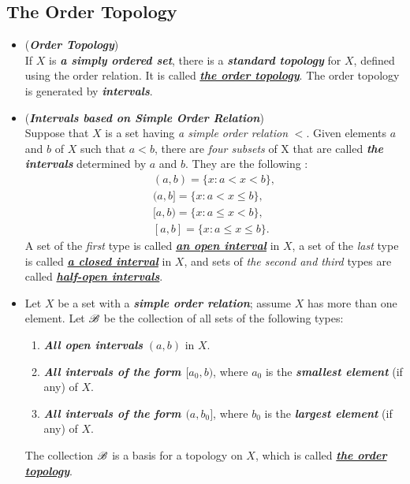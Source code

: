 \documentclass[11pt]{article}
\begin{document}
\subsection{The Order Topology}
\begin{itemize}
\item \begin{example}(\emph{\textbf{Order Topology}})\\
If $X$ is \emph{\textbf{a simply ordered set}}, there is a \emph{\textbf{standard topology}} for $X$, defined using the order relation. It is called \underline{\emph{\textbf{the order topology}}}. The order topology is generated by \emph{\textbf{intervals}}.
\end{example}

\item \begin{definition} (\emph{\textbf{Intervals based on Simple Order Relation}})\\
Suppose that $X$ is a set having \emph{a simple order relation} $<$. Given elements $a$ and $b$ of $X$ such that $a < b$, there are \emph{four subsets} of X that are called \emph{\textbf{the intervals}} determined by $a$ and $b$. They are the following :
\begin{align*}
(a,b) = \{x: a < x < b\},\\
(a,b] = \{x: a < x \le b\},\\
[a,b) = \{x: a \le x < b\},\\
[a, b] = \{x: a \le x \le b\}.
\end{align*}
A set of the \emph{first} type is called \underline{\textit{\textbf{an open interval}}} in $X$, a set of the \emph{last} type is called \underline{\textit{\textbf{a closed interval}}} in $X$, and sets of \emph{the second and third} types are called \underline{\textit{\textbf{half-open intervals}}}.
\end{definition}

\item \begin{definition}
Let $X$ be a set with a \emph{\textbf{simple order relation}}; assume $X$ has more than one element. Let ${\mathscr B}$ be the collection of all sets of the following types:
\begin{enumerate}
\item \emph{\textbf{All open intervals}} $(a, b)$ in $X$.
\item \emph{\textbf{All intervals of the form $[a_0,b)$}}, where $a_0$ is the \emph{\textbf{smallest element}} (if any) of $X$.
\item \emph{\textbf{All intervals of the form $(a, b_0]$}}, where $b_0$ is the \emph{\textbf{largest element}} (if any) of $X$.
\end{enumerate}
The collection ${\mathscr B}$ is a basis for a topology on $X$, which is called \underline{\emph{\textbf{the order topology}}}.
\end{definition}


\end{itemize}
\end{document}
